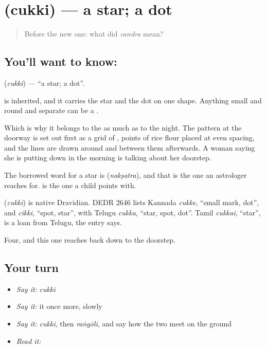\section[\texorpdfstring{\kn{ಚುಕ್ಕಿ} (cukki)}{ಚುಕ್ಕಿ (cukki)}]{ (cukki) — a star; a dot}

\label{lesson:KA-C53-star}



\begin{quote}
Before the new one: what did \emph{candra} mean?
\end{quote}

\subsection*{You'll want to know: }
\textbf{} (\emph{cukki}) — \textquotedblleft{}a star; a dot\textquotedblright{}.

 is inherited, and it carries the star and the dot on one shape. Anything small and round and separate can be a .

Which is why it belongs to the  as much as to the night. The pattern at the doorway is set out first as a grid of , points of rice flour placed at even spacing, and the lines are drawn around and between them afterwards. A woman saying she is putting down  in the morning is talking about her doorstep.

The borrowed word for a star is  (\emph{nakṣatra}), and that is the one an astrologer reaches for.  is the one a child points with.

\begin{cousinweb}
\textbf{} (\emph{cukki}) is native Dravidian. DEDR 2646 lists Kannada \emph{cukke}, \textquotedblleft{}small mark, dot\textquotedblright{}, and \emph{cikki}, \textquotedblleft{}spot, star\textquotedblright{}, with Telugu \emph{cukka}, \textquotedblleft{}star, spot, dot\textquotedblright{}. Tamil \emph{cukkai}, \textquotedblleft{}star\textquotedblright{}, is a loan from Telugu, the entry says.
\end{cousinweb}

\begin{grammarlens}[title={What you've built}]
Four, and this one reaches back down to the doorstep.
\end{grammarlens}

\subsection*{Your turn}
\begin{itemize}
\raggedright
  \item \emph{Say it:} \emph{cukki}
  \item \emph{Say it:} it once more, slowly
  \item \emph{Say it:} \emph{cukki}, then \emph{raṅgōli}, and say how the two meet on the ground
  \item \emph{Read it:} \textbf{}
\end{itemize}

